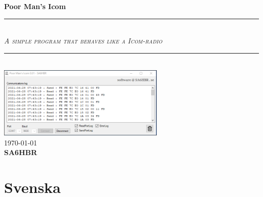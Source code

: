 \documentclass[a4paper]{article}
\begin{document}
\begin{titlepage}
\vspace*{100px}
\newcommand{\HRule}{\rule{\linewidth}{0.5mm}} 	
\center 
 
{ \huge \bfseries Poor Man's Icom}
\vspace*{50px}

\HRule \\[0.8cm]

\textsc{\normalsize \emph {A simple program that behaves like a Icom-radio}}\\[0.8cm]

\HRule \\[1cm]

\includegraphics[width=0.6\textwidth]{../image/PoorMansIcom.png}\\[3cm] 

{\large \today}\\[2cm]
\textsc{ \huge \bfseries SA6HBR}\\[1cm]

\vfill 
\end{titlepage}

\pagestyle{fancy}
\fancyhf{}
\lhead{\today}

\cfoot{ \thepage}



\section*{Svenska}
\end{document}
